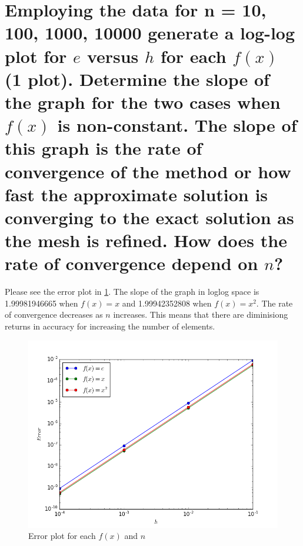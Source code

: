 \documentclass{article}
\begin{document}
\section{Employing the data for n = 10, 100, 1000, 10000 generate a log-log plot for $e$ versus $h$ for each $f(x)$ (1 plot). Determine the slope of the graph for the two cases when $f(x)$ is non-constant. The slope of this graph is the rate of convergence of the method or how fast the approximate solution is converging to the exact solution as the mesh is refined. How does the rate of convergence depend on $n$?}

Please see the error plot in \cref{fig:error}. The slope of the graph in loglog space is 1.99981946665 when $f(x)=x$ and 1.99942352808 when $f(x)=x^2$. The rate of convergence decreases as $n$ increases. This means that there are diminisiong returns in accuracy for increasing the number of elements.

\begin{figure}
	\includegraphics{error}
	\caption{Error plot for each $f(x)$ and $n$}\label{fig:error}
\end{figure}
\end{document}
